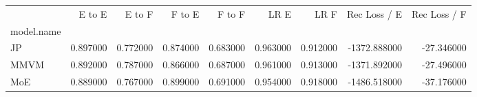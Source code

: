 \begin{tabular}{lrrrrrrrr}
\toprule
 & E to E & E to F & F to E & F to F & LR E & LR F & Rec Loss / E & Rec Loss / F \\
model.name &  &  &  &  &  &  &  &  \\
\midrule
JP & 0.897000 & 0.772000 & 0.874000 & 0.683000 & 0.963000 & 0.912000 & -1372.888000 & -27.346000 \\
MMVM & 0.892000 & 0.787000 & 0.866000 & 0.687000 & 0.961000 & 0.913000 & -1371.892000 & -27.496000 \\
MoE & 0.889000 & 0.767000 & 0.899000 & 0.691000 & 0.954000 & 0.918000 & -1486.518000 & -37.176000 \\
\bottomrule
\end{tabular}
